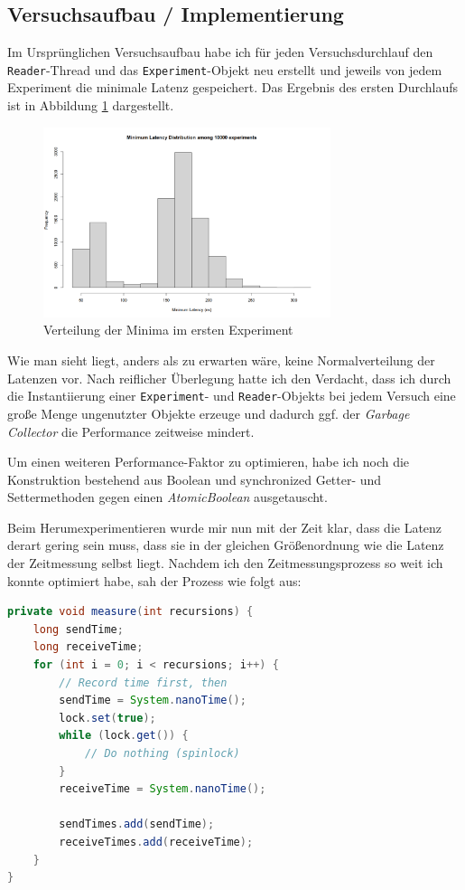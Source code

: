 \documentclass[12pt]{article}
\begin{document}
\subsection*{Versuchsaufbau / Implementierung}
Im Ursprünglichen Versuchsaufbau habe ich für jeden Versuchsdurchlauf den \texttt{Reader}-Thread und das \texttt{Experiment}-Objekt neu erstellt und jeweils von jedem Experiment die minimale Latenz gespeichert.
Das Ergebnis des ersten Durchlaufs ist in Abbildung \ref{img:spinlock_first} dargestellt.

\begin{figure}[H]
	\centering
	\includegraphics[width=0.75\textwidth]{./img/spinlock_first_try}
	\caption{Verteilung der Minima im ersten Experiment}
	\label{img:spinlock_first}
\end{figure}

Wie man sieht liegt, anders als zu erwarten wäre, keine Normalverteilung der Latenzen vor.
Nach reiflicher Überlegung hatte ich den Verdacht, dass ich durch die Instantiierung einer \texttt{Experiment}- und \texttt{Reader}-Objekts bei jedem Versuch eine große Menge ungenutzter Objekte erzeuge und dadurch ggf. der \emph{Garbage Collector} die Performance zeitweise mindert.

Um einen weiteren Performance-Faktor zu optimieren, habe ich noch die Konstruktion bestehend aus Boolean und synchronized Getter- und Settermethoden gegen einen \emph{AtomicBoolean} ausgetauscht.

Beim Herumexperimentieren wurde mir nun mit der Zeit klar, dass die Latenz derart gering sein muss, dass sie in der gleichen Größenordnung wie die Latenz der Zeitmessung selbst liegt.
Nachdem ich den Zeitmessungsprozess so weit ich konnte optimiert habe, sah der Prozess wie folgt aus:
\begin{lstlisting}[language=java,caption={Latenzmessung im Main Thread (optimiert)}]
private void measure(int recursions) {
	long sendTime;
	long receiveTime;
	for (int i = 0; i < recursions; i++) {
		// Record time first, then
		sendTime = System.nanoTime();
		lock.set(true);
		while (lock.get()) {
			// Do nothing (spinlock)
		}
		receiveTime = System.nanoTime();
		
		sendTimes.add(sendTime);
		receiveTimes.add(receiveTime);
	}
}
\end{lstlisting}
\end{document}

